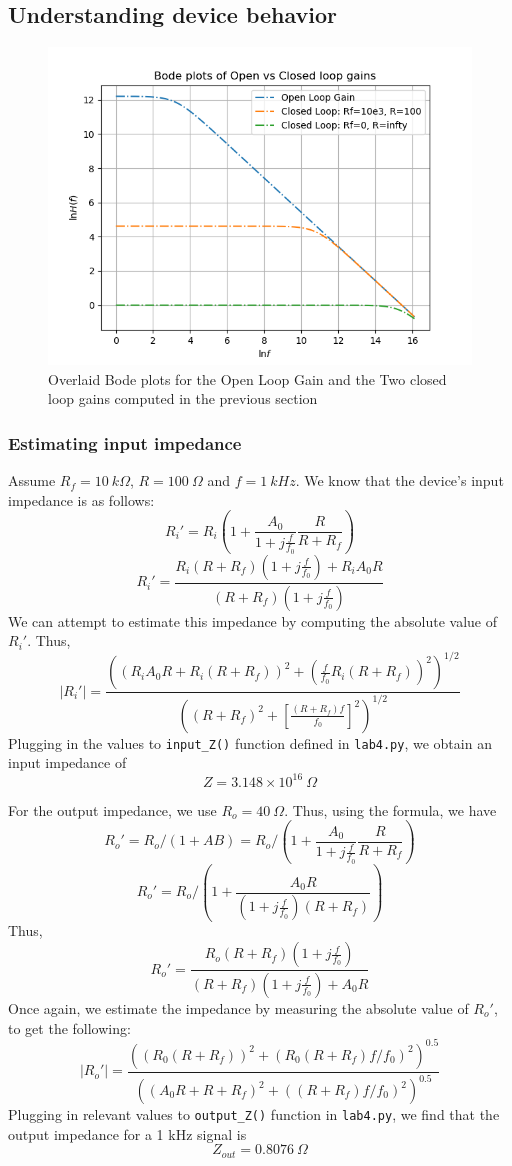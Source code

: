 \documentclass[english]{article}
\begin{document}
\subsection{Understanding device behavior}
\begin{figure}
	\centering
	\includegraphics[scale=0.7]{bode_plots_overlaid.png}
	\caption{Overlaid Bode plots for the Open Loop Gain and the Two closed loop gains computed
	in the previous section}
	\label{fig:bode_overlaid}
\end{figure}

\subsubsection{Estimating input impedance}
Assume $R_f = 10\ k\Omega$, $R = 100\ \Omega$ and $f = 1\ kHz$. 
We know that the device's input impedance is as follows:
$$ R_i '=R_i(1+\frac{A_0}{1+j\frac{f}{f_0}}\frac{R}{R+R_f}) $$
$$ R_i' = \frac{R_i(R+R_f)\left(1+j\frac{f}{f_0}\right)+R_i A_0 R}{(R+R_f)\left(1+j\frac{f}{f_0}\right)}$$
We can attempt to estimate this impedance by computing the absolute value of $R_i'$.
Thus,
$$ \left|R_i'\right| = \frac{\left((R_i A_0 R+R_i(R+R_f))^{2}+\left(\frac{f}{f_0}R_i(R+R_f)\right)^{2}\right)^{1/2}}
						{\left((R+R_f)^{2}+\left[\frac{(R+R_f)f}{f_0}\right]^{2}\right)^{1/2}}
$$
Plugging in the values to \lstinline{input_Z()} function defined in \lstinline{lab4.py},
we obtain an input impedance of 
$$ Z = 3.148\times10^{16}\ \Omega $$

For the output impedance, we use $R_o = 40\ \Omega$. Thus, using the formula, we have
$$ R_o' = R_o/(1+AB)=R_o/(1+\frac{A_0}{1+j\frac{f}{f_0}}\frac{R}{R+R_f})$$
$$ R_o' = R_o/\left(1+\frac{A_0R}{\left(1+j\frac{f}{f_0}\right)(R+R_f)}\right) $$
Thus,
$$ R_o' = \frac{R_o(R+R_f)(1+j\frac{f}{f_0})}{(R+R_f)(1+j\frac{f}{f_0})+A_0R} $$
Once again, we estimate the impedance by measuring the absolute value of $R_o'$,
to get the following:
$$ \left|R_o'\right| = \frac{\left((R_0(R+R_f))^{2}+(R_0(R+R_f)f/f_0)^{2}\right)^{0.5}}{\left((A_0R+R+R_f)^{2}+((R+R_f)f/f_0)^2\right)^{0.5}}$$
Plugging in relevant values to \lstinline{output_Z()} function in 
\lstinline{lab4.py}, we find that the output impedance for a 1 kHz signal is 
$$ Z_{out} = 0.8076\ \Omega$$
\end{document}
